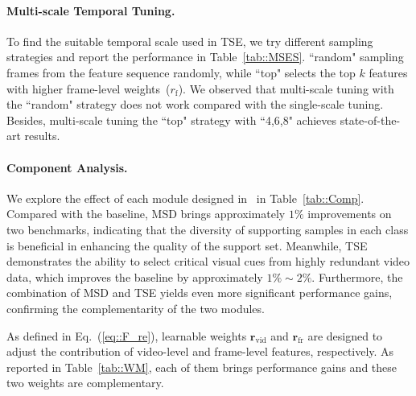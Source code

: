 \paragraph{Multi-scale Temporal Tuning.}\label{sec::ab_temp_sampling}
{
    To find the suitable temporal scale used in TSE, we try different sampling strategies and report the performance in Table~\ref{tab::MSES}. ``random" sampling frames from the feature sequence randomly, while ``top" selects the top $k$ features with higher frame-level weights~($r_\mathrm{f}$). We observed that multi-scale tuning with the ``random" strategy does not work compared with the single-scale tuning. Besides, multi-scale tuning the ``top" strategy with ``4,6,8" achieves state-of-the-art results. 
}



\paragraph{Component Analysis.}
{
    We explore the effect of each module designed in \testv~in Table~\ref{tab::Comp}. Compared with the baseline, MSD brings approximately $1\%$ improvements on two benchmarks, indicating that the diversity of supporting samples in each class is beneficial in enhancing the quality of the support set. Meanwhile, TSE demonstrates the ability to select critical visual cues from highly redundant video data, which improves the baseline by approximately $1\%\sim 2\%$. Furthermore, the combination of MSD and TSE yields even more significant performance gains, confirming the complementarity of the two modules.

    As defined in Eq.~(\ref{eq::F_re}), learnable weights $\bm{r}_\mathrm{vid}$ and $\bm{r}_\mathrm{fr}$ are designed to adjust the contribution of video-level and frame-level features, respectively. As reported in Table~\ref{tab::WM}, each of them brings performance gains and these two weights are complementary.
}

